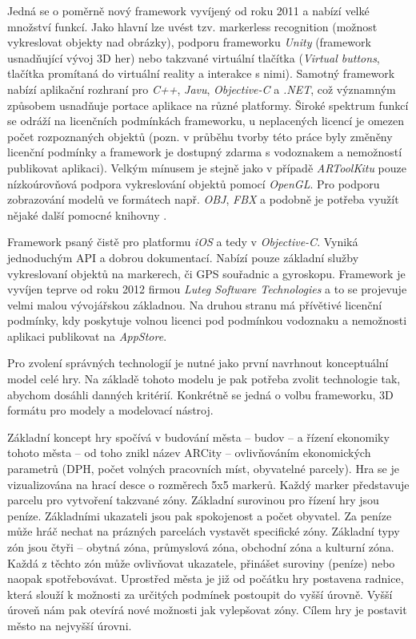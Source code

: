 \documentclass[twoside,12pt]{article}
\begin{document}
Jedná se o poměrně nový framework vyvíjený od roku 2011 a nabízí velké množství funkcí. Jako hlavní lze uvést tzv. markerless recognition (možnost vykreslovat objekty nad obrázky), podporu frameworku \textit{Unity} (framework usnadňující vývoj 3D her) nebo takzvané virtuální tlačítka (\textit{Virtual buttons}, tlačítka promítaná do virtuální reality a interakce s nimi). Samotný framework nabízí aplikační rozhraní pro \textit{C++}, \textit{Javu}, \textit{Objective-C} a \textit{.NET}, což významným způsobem usnadňuje portace aplikace na různé platformy. Široké spektrum funkcí se odráží na licenčních podmínkách frameworku, u neplacených licencí je omezen počet rozpoznaných objektů (pozn. v průběhu tvorby této práce byly změněny licenční podmínky a framework je dostupný zdarma s vodoznakem a nemožností publikovat aplikaci). Velkým mínusem je stejně jako v případě \textit{ARToolKitu} pouze nízkoúrovňová podpora vykreslování objektů pomocí \textit{OpenGL}. Pro podporu zobrazování modelů ve formátech např. \textit{OBJ}, \textit{FBX} a podobně je potřeba využít nějaké další pomocné knihovny \cite{vuforia_3dformats}.

Framework psaný čistě pro platformu \textit{iOS} a tedy v \textit{Objective-C}. Vyniká jednoduchým API a dobrou dokumentací. Nabízí pouze základní služby vykreslovaní objektů na markerech, či GPS souřadnic a gyroskopu. Framework je vyvíjen teprve od roku 2012 firmou \textit{Luteg Software Technologies} a to se projevuje velmi malou vývojářskou základnou. Na druhou stranu má přívětivé licenční podmínky, kdy poskytuje volnou licenci pod podmínkou vodoznaku a nemožnosti aplikaci publikovat na \textit{AppStore}. 

\newpage
{}
Pro zvolení správných technologií je nutné jako první navrhnout konceptuální model celé hry. Na základě tohoto modelu je pak potřeba zvolit technologie tak, abychom dosáhli danných kritérií. Konkrétně se jedná o volbu frameworku, 3D formátu pro modely a modelovací nástroj.

Základní koncept hry spočívá v budování města -- budov -- a řízení ekonomiky tohoto města -- od toho znikl název ARCity -- ovlivňováním ekonomických parametrů (DPH, počet volných pracovních míst, obyvatelné parcely). Hra se je vizualizována na hrací desce o rozměrech 5x5 markerů. Každý marker představuje parcelu pro vytvoření takzvané zóny. Základní surovinou pro řízení hry jsou peníze. Základními ukazateli jsou pak spokojenost a počet obyvatel.  Za peníze může hráč nechat na prázných parcelách vystavět specifické zóny. Základní typy zón jsou čtyři -- obytná zóna, průmyslová zóna, obchodní zóna a kulturní zóna. Každá z těchto zón může ovlivňovat ukazatele, přinášet suroviny (peníze) nebo naopak spotřebovávat. Uprostřed města je již od počátku hry postavena radnice, která slouží k možnosti za určitých podmínek postoupit do vyšší úrovně. Vyšší úroveň nám pak otevírá nové možnosti jak vylepšovat zóny. Cílem hry je postavit město na nejvyšší úrovni. 
\end{document}
